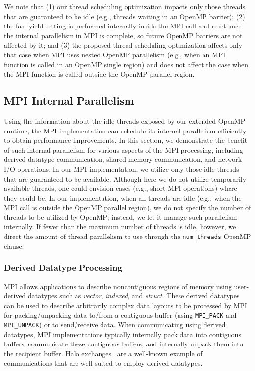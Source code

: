 We note that (1) our thread scheduling optimization impacts only
those threads that are guaranteed to be idle (e.g., threads waiting in
an OpenMP barrier); (2) the fast yield setting is performed internally
inside the MPI call and reset once the internal parallelism in MPI is
complete, so future OpenMP barriers are not affected by it; and (3)
the proposed thread scheduling optimization affects only that case
when MPI uses nested OpenMP parallelism (e.g., when an MPI function
is called in an OpenMP single region) and does not affect the case
when the MPI function is called outside the OpenMP parallel region.


\subsection{MPI Internal Parallelism}\label{sec:des-mpi}

Using the information about the idle threads exposed by our extended
OpenMP runtime, the MPI implementation can schedule its internal
parallelism efficiently to obtain performance improvements. In this
section, we demonstrate the benefit of such internal parallelism for
various aspects of the MPI processing, including derived datatype
communication, shared-memory communication, and network I/O
operations.  In our MPI implementation, we utilize only those idle
thre\-ads that are guaranteed to be available.  Although here we do
not utilize temporarily available threads, one could envision cases
(e.g., short MPI operations) where they could be.  In our
implementation, when all threads are idle (e.g., when the MPI call is
outside the OpenMP parallel region), we do not specify the number of
threads to be utilized by OpenMP; instead, we let it manage such
parallelism internally.  If fewer than the maximum number of threads
is idle, however, we direct the amount of thread parallelism to use
through the \texttt{num\_threads} OpenMP clause.


\subsubsection{Derived Datatype Processing}\label{sec:imp-ddt}

MPI allows applications to describe noncontiguous regions of memory
using user-derived datatypes such as \textit{vector},
\textit{indexed}, and \textit{struct}.  These derived datatypes can be
used to describe arbitrarily complex data layouts to be processed by
MPI for packing/unpacking data to/from a contiguous buffer (using
\texttt{MPI\_PACK} and \texttt{MPI\_UNPACK}) or to send/receive data.
When communicating using derived datatypes, MPI implementations
typically internally pack data into contiguous buffers, communicate
these contiguous buffers, and internally unpack them into the
recipient buffer.  Halo exchanges~\cite{halo} are a well-known example
of communications that are well suited to employ derived datatypes.

